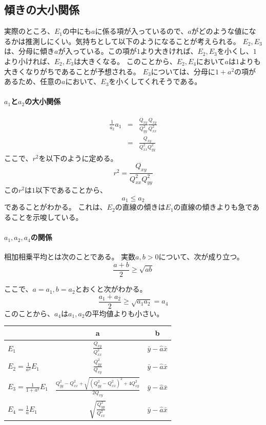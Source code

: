 \subsection{傾きの大小関係}
実際のところ、$E_1$の中にも$a$に係る項が入っているので、$a$がどのような値になるかは推測しにくい。気持ちとして以下のようになることが考えられる。
$E_2,E_3$は、分母に傾き$a$が入っている。この項が$1$より大きければ、$E_2,E_3$を小くし、$1$より小ければ、$E_2,E_3$は大きくなる。
このことから、$E_2,E_4$において$a$は$1$よりも大きくなりがちであることが予想される。
$E_3$については、分母に$1+a^2$の項があるため、任意の$a$において、$E_3$を小くしてくれそうである。

\paragraph{$a_1$と$a_2$の大小関係}
\begin{eqnarray*}
 \frac{1}{a_2}a_1 &=& \frac{Q_{xy}}{Q^2_{yy}}\frac{Q_{xy}}{Q^2_{xx}} \\
 &=& \frac{Q_{xy}}{Q^2_{xx}Q^2_{yy}}
\end{eqnarray*}
ここで、$r^2$を以下のように定める。
\begin{equation*}
 r^2 = \frac{Q_{xy}}{Q^2_{xx}Q^2_{yy}}
\end{equation*}
この$r^2$は$1$以下であることから、
\begin{equation*}
 a_1 \leq a_2
\end{equation*}
であることがわかる。
これは、$E_2$の直線の傾きは$E_1$の直線の傾きよりも急であることを示唆している。

\paragraph{$a_1,a_2,a_4$の関係}
相加相乗平均とは次のことである。
実数$a,b>0$について、次が成り立つ。
\begin{equation*}
 \frac{a+b}{2} \geq \sqrt{ab}
\end{equation*}

ここで、$a=a_1,b=a_2$とおくと次がわかる。
\begin{equation*}
 \frac{a_1+a_2}{2}  \geq  \sqrt{a_1 a_2} = a_4
\end{equation*}
このことから、$a_4$は$a_1,a_2$の平均値よりも小さい。



\begin{table}[http]
 \centering
 \begin{tabular}{lcc}
  & a & b\\
  \hline 
  $E_1$ & $\frac{Q_{xy}}{Q^2_{xx}}$  &$\bar{y}-\hat{a}\bar{x}$ \\
  $E_2=\frac{1}{a^2}E_1$ & $\frac{Q^2_{yy}}{Q_{xy}}$ & $\bar{y}-\hat{a}\bar{x}$ \\
$E_3=\frac{1}{1+a^2}E_1$ & $\frac{Q^2_{yy}-Q^2_{xx}+\sqrt{(Q^2_{yy}-Q^2_{xx})^2+4Q_{xy}^2}}{2Q_{xy}}$ & $\bar{y}-\hat{a}\bar{x}$ \\
  $E_4=\frac{1}{a}E_1$ & $\sqrt{\frac{Q^2_{yy}}{Q^2_{xx}}}$ & $\bar{y}-\hat{a}\bar{x}$
 \end{tabular}
\end{table}

